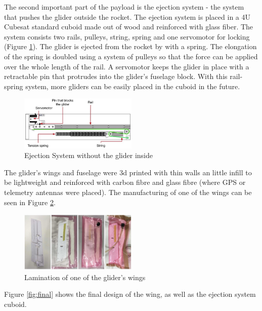 The second important part of the payload is the ejection system - the system that pushes the glider outside the rocket.
The ejection system is placed in a 4U Cubesat standard cuboid made out of wood and reinforced with glass fiber. The system consists two rails, pulleys, string, spring and one servomotor for locking (Figure \ref{fig:ejection}). The glider is ejected from the rocket by with a spring. The elongation of the spring is doubled using a system of pulleys so that the force can be applied over the whole length of the rail. A servomotor keeps the glider in place with a retractable pin that protrudes into the glider's fuselage block. With this rail-spring system, more gliders can be easily placed in the cuboid in the future.

\begin{figure}[h!]
    \centering
        \includegraphics[width=0.5\textwidth]{img/ejection_system.JPG}
        \caption{Ejection System without the glider inside}
        \label{fig:ejection}
 \end{figure}

The glider's wings and fuselage were 3d printed with thin walls an little infill to be lightweight and reinforced with carbon fibre and glass fibre (where GPS or telemetry antennas were placed). The manufacturing of one of the wings can be seen in Figure \ref{fig:manufact}.

\begin{figure}[h!]
    \centering
        \includegraphics[width=0.5\textwidth]{img/manuf.jpg}
        \caption{Lamination of one of the glider's wings}
        \label{fig:manufact}
 \end{figure}


Figure \ref{fig:final} shows the final design of the wing, as well as the ejection system cuboid.



